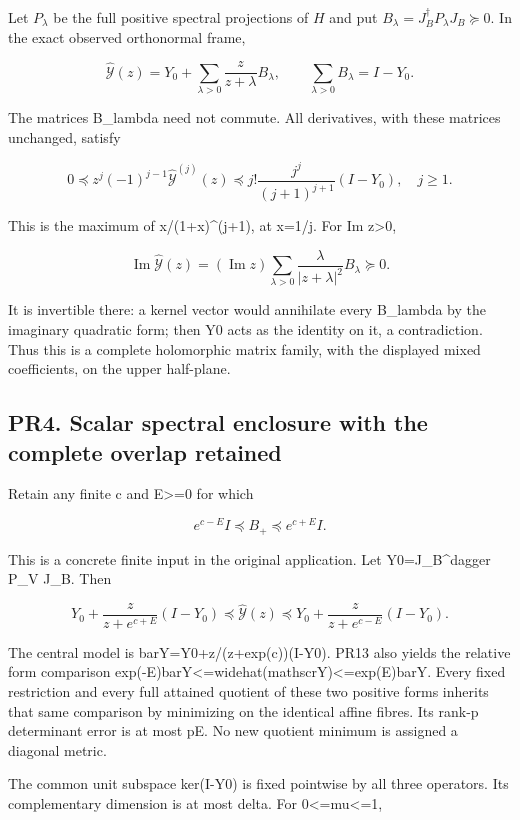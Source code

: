 \documentclass[11pt]{article}
\begin{document}
Let \(P_\lambda\) be the full positive spectral projections of \(H\) and put \(B_\lambda=J_B^\dagger P_\lambda J_B\succeq0\). In the exact observed orthonormal frame,

\[
\widehat{\mathscr Y}(z)=Y_0+
\sum_{\lambda>0}\frac z{z+\lambda}B_\lambda,\qquad
\sum_{\lambda>0}B_\lambda=I-Y_0.
\tag{PR12a}
\]

The matrices B\_lambda need not commute. All derivatives, with these matrices unchanged, satisfy

\[
0\preceq z^j(-1)^{j-1}\widehat{\mathscr Y}^{(j)}(z)
\preceq j!\frac{j^j}{(j+1)^{j+1}}(I-Y_0),\quad j\ge1.
\tag{PR12b}
\]

This is the maximum of x/(1+x)\^{}(j+1), at x=1/j. For Im z\textgreater0,

\[
\operatorname{Im}\widehat{\mathscr Y}(z)
=(\operatorname{Im}z)\sum_{\lambda>0}
\frac{\lambda}{|z+\lambda|^2}B_\lambda\succeq0.
\tag{PR12c}
\]

It is invertible there: a kernel vector would annihilate every B\_lambda by the imaginary quadratic form; then Y0 acts as the identity on it, a contradiction. Thus this is a complete holomorphic matrix family, with the displayed mixed coefficients, on the upper half-plane.

\subsection{PR4. Scalar spectral enclosure with the complete overlap retained}\label{pr4.-scalar-spectral-enclosure-with-the-complete-overlap-retained}

Retain any finite c and E\textgreater=0 for which

\[
e^{c-E}I\preceq B_+\preceq e^{c+E}I.
\]

This is a concrete finite input in the original application. Let Y0=J\_B\^{}dagger P\_V J\_B. Then

\[
Y_0+\frac z{z+e^{c+E}}(I-Y_0)
\preceq\widehat{\mathscr Y}(z)
\preceq
Y_0+\frac z{z+e^{c-E}}(I-Y_0).
\tag{PR13}
\]

The central model is barY=Y0+z/(z+exp(c))(I-Y0). PR13 also yields the relative form comparison exp(-E)barY\textless=widehat(mathscrY)\textless=exp(E)barY. Every fixed restriction and every full attained quotient of these two positive forms inherits that same comparison by minimizing on the identical affine fibres. Its rank-p determinant error is at most pE. No new quotient minimum is assigned a diagonal metric.

The common unit subspace ker(I-Y0) is fixed pointwise by all three operators. Its complementary dimension is at most delta. For 0\textless=mu\textless=1,
\end{document}
